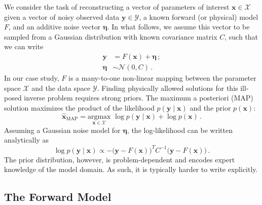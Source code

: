We consider the task of reconstructing a vector of parameters of interest $\mathbf{x} \in \mathcal{X}$ given a vector of noisy
observed data $\mathbf{y} \in \mathcal{Y}$, a known forward (or physical) model $F$, and an additive noise vector $\boldsymbol{\eta}$. 
In what follows, we assume this vector to be sampled from a Gaussian distribution with known covariance matrix $C$, 
such that we can write
\begin{equation}\label{eq:MainEquation} 
\begin{aligned}
        \mathbf{y} &= F(\mathbf{x}) + \boldsymbol{\eta}\, ;\\[2pt]
        \boldsymbol{\eta} &\sim \mathcal{N}(0, C)\, .
\end{aligned}
\end{equation} 
In our case study, $F$ is a many-to-one non-linear 
mapping between the parameter space $\mathcal{X}$ 
and the data space $\mathcal{Y}$. 
Finding physically allowed solutions for this ill-posed inverse problem requires strong priors. The maximum a posteriori (MAP) solution maximizes the product of the likelihood $p(\mathbf{y} \mid \mathbf{x})$ and the prior $p(\mathbf{x})$:
\begin{equation}\label{eq:Posterior} 
        \hat{\mathbf{x}}_{\mathrm{MAP}} = \underset{\mathbf{x} \in \mathcal{X}}{ \mathrm{argmax}}\,\,
        \log p(\mathbf{y} \mid \mathbf{x}) + \log p(\mathbf{x})\, .
\end{equation} 
Assuming a Gaussian noise model for $\boldsymbol{\eta}$, the log-likelihood can be written analytically as
\begin{equation}\label{eq:Likelihood} 
        \log p(\mathbf{y} \mid \mathbf{x}) \propto -
        \big(\mathbf{y} - F(\mathbf{x})\big)^{T} C^{-1} \big(\mathbf{y} - F(\mathbf{x})\big)\, .
\end{equation} 
The prior distribution, however, is problem-dependent and encodes
expert knowledge of the model domain. As such, it is typically harder to write explicitly. 

\subsection{The Forward Model}\label{sec:forward model}

